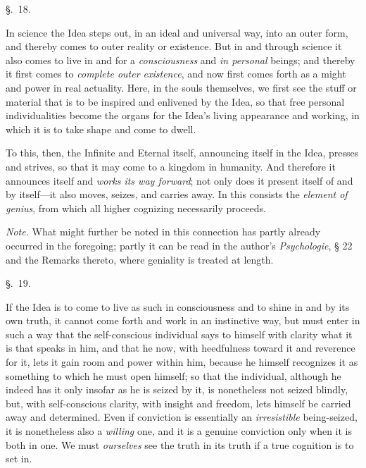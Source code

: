 \documentclass[12pt,a4paper]{book}
\begin{document}
\begin{center}\large\S.~18.\end{center}
In science the Idea steps out, in an ideal and universal way, into an outer form, and
thereby comes to outer reality or existence. But in and through science it also comes to
live in and for a \emph{consciousness} and \emph{in personal} beings; and thereby it first comes to
\emph{complete outer existence}, and now first comes forth as a might and power in real
actuality. Here, in the souls themselves, we first see the stuff or material that is to be
inspired and enlivened by the Idea, so that free personal individualities become the organs
for the Idea's living appearance and working, in which it is to take shape and come to dwell.

To this, then, the Infinite and Eternal itself, announcing itself in the Idea, presses and
strives, so that it may come to a kingdom in humanity. And therefore it announces itself and
\emph{works its way forward}; not only does it present itself of and by itself---it also
moves, seizes, and carries away. In this consists the \emph{element of genius}, from which all
higher cognizing necessarily proceeds.

\emph{Note.} What might further be noted in this connection has partly already occurred in the
foregoing; partly it can be read in the author's \textit{Psychologie}, § 22 and the Remarks
thereto, where geniality is treated at length.

\begin{center}\large\S.~19.\end{center}
If the Idea is to come to live as such in consciousness and to shine in and by its own truth,
it cannot come forth and work in an instinctive way, but must enter in such a way that the
self-conscious individual says to himself with clarity what it is that speaks in him, and that
he now, with heedfulness toward it and reverence for it, lets it gain room and power within
him, because he himself recognizes it as something to which he must open himself; so that the
individual, although he indeed has it only insofar as he is seized by it, is nonetheless not
seized blindly, but, with self-conscious clarity, with insight and freedom, lets himself be
carried away and determined. Even if conviction is essentially an \emph{irresistible} being-seized,
it is nonetheless also a \emph{willing} one, and it is a genuine conviction only when it is both in
one. We must \emph{ourselves} see the truth in its truth if a true cognition is to set in.
\end{document}

